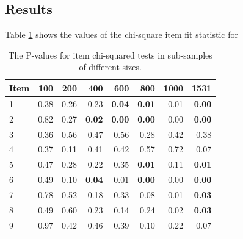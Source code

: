 \documentclass{article}
\begin{document}
\subsection{Results}

Table \ref{chi} shows the values of the chi-square item fit statistic for
\begin{table}[]
\caption{{The P-values for item chi-squared tests in sub-samples of different sizes.}}
\label{chi}
\begin{center}
\begin{tabular}{lrrrrrrr}\hline\hline
Item& 100  & 200  & 400      & 600       &  800     & 1000 & 1531\\\hline
1   & 0.38 & 0.26 & 0.23     & {\bf0.04} & {\bf0.01}& 0.01 & {\bf0.00}\\
2   & 0.82 & 0.27 & {\bf0.02}& {\bf0.00} & {\bf0.00}& 0.00 & {\bf0.00}\\
3   & 0.36 & 0.56 & 0.47     & 0.56      & 0.28     & 0.42 & 0.38\\
4   & 0.37 & 0.11 & 0.41     & 0.42      & 0.57     & 0.72 & 0.07\\
5   & 0.47 & 0.28 & 0.22     & 0.35      & {\bf0.01}& 0.11 & {\bf0.01}\\
6   & 0.49 & 0.10 & {\bf0.04}& 0.01      & {\bf0.00}& 0.00 & {\bf0.00}\\
7   & 0.78 & 0.52 & 0.18     & 0.33      & 0.08     & 0.01 & {\bf0.03}\\
8   & 0.49 & 0.60 & 0.23     & 0.14      & 0.24     & 0.02 & {\bf0.03}\\
9   & 0.97 & 0.42 & 0.46     & 0.39      & 0.10     & 0.22 & 0.07\\\hline
\end{tabular}
\end{center}
\end{table}
\end{document}
